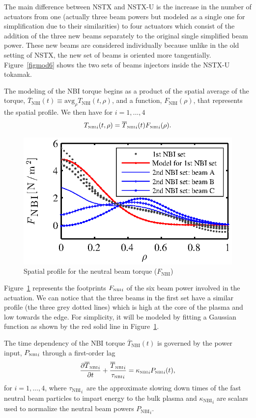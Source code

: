 \documentclass[12pt,lot, lof]{puthesis}
\begin{document}
The main difference between NSTX and NSTX-U is the increase in the number of actuators from one (actually three beam powers but modeled as a single one for simplification due to their similarities) to four actuators which consist of the addition of the three new beams separately to the original single simplified beam power. These new beams are considered individually because unlike in the old setting of NSTX, the new set of beams is oriented more tangentially. Figure~{\ref{figmod6}} shows the two sets of beams injectors inside the NSTX-U tokamak.

The modeling of the NBI torque begins as a product of the spatial average of the torque, $\overline{T}_\text{NBI}(t) \equiv \text{avg}_\rho T_\text{NBI}(t,\rho)$, and a function, $F_\text{NBI}(\rho)$, that represents the spatial profile.
We then have for $i=1,...,4$  
\begin{equation}
{T_\textrm{\tiny{NBI}}}_i(t,\rho) = {\overline{T}_\textrm{\tiny{NBI}}}_i(t) {F_\textrm{\tiny{NBI}}}_i(\rho).
\label{model5}
\end{equation}

\begin{figure} 
\centering
\includegraphics [width=0.7 \linewidth]{chap10/fig4} 
\caption{Spatial profile for the neutral beam torque ($F_\text{NBI} $) }
\label{figmod5}
\end{figure} 
Figure~{\ref{figmod5}} represents the footprints ${F_\textrm{\tiny{NBI}}}_i$ of the six beam power involved in the actuation. We can notice that the three beams in the first set have a similar profile (the three grey dotted lines) which is high at the core of the plasma and low towards the edge. For simplicity, it will be modeled by fitting a Gaussian function as shown by the red solid line in Figure~{\ref{figmod5}}.

The time dependency of the NBI torque $\overline{T}_\text{NBI}(t)$ is governed by the power input, $ {P_\textrm{\tiny{NBI}}}_i$ through a first-order lag
 \begin{equation}
\frac{{\partial \overline{T}_\textrm{\tiny{NBI}}}_i}{\partial t}
+ \frac{{\overline{T}_\textrm{\tiny{NBI}}}_i}{{\tau_\textrm{\tiny{NBI}}}_i}  = {\kappa_\textrm{\tiny{NBI}}}_i {P_\textrm{\tiny{NBI}}}_i(t), \label{model7}
\end{equation}
for $i=1,...,4$, where ${\tau_\text{NBI}}_i$\, are the approximate slowing down times of the fast neutral beam particles to impart energy to the bulk plasma and ${\kappa_\text{NBI}}_i$ are scalars used to normalize the neutral beam powers ${P_\text{NBI}}_i$.
\end{document}
